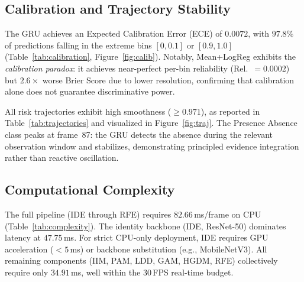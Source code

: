 \documentclass[conference]{IEEEtran}
\begin{document}
\subsection{Calibration and Trajectory Stability}
The GRU achieves an Expected Calibration Error (ECE) of $0.0072$, with $97.8\%$ of predictions falling in the extreme bins $[0, 0.1]$ or $[0.9, 1.0]$ (Table~\ref{tab:calibration}, Figure~\ref{fig:calib}). Notably, Mean+LogReg exhibits the \emph{calibration paradox}: it achieves near-perfect per-bin reliability (Rel.\ $= 0.0002$) but $2.6{\times}$ worse Brier Score due to lower resolution, confirming that calibration alone does not guarantee discriminative power.

All risk trajectories exhibit high smoothness ($\ge 0.971$), as reported in Table~\ref{tab:trajectories} and visualized in Figure~\ref{fig:traj}. The Presence Absence class peaks at frame~87: the GRU detects the absence during the relevant observation window and stabilizes, demonstrating principled evidence integration rather than reactive oscillation.

\subsection{Computational Complexity}
The full pipeline (IDE through RFE) requires $82.66$\,ms/frame on CPU (Table~\ref{tab:complexity}). The identity backbone (IDE, ResNet-50) dominates latency at $47.75$\,ms. For strict CPU-only deployment, IDE requires GPU acceleration ($<5$\,ms) or backbone substitution (e.g., MobileNetV3). All remaining components (IIM, PAM, LDD, GAM, HGDM, RFE) collectively require only $34.91$\,ms, well within the 30\,FPS real-time budget.

\begin{table}[!t]
\caption{Signal Ablation Results (Full 6-Signal System)}
\label{tab:ablation}
\centering
{}
\end{table}
\end{document}
